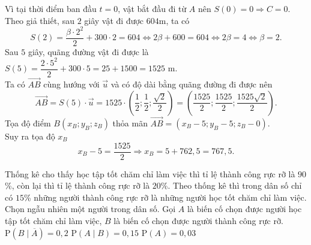 \begin{ex}
{\begin{itemchoice}
			Vì tại thời điểm ban đầu $t=0$, vật bắt đầu đi từ $A$ nên $S(0)=0 \Rightarrow C=0$.\\
			Theo giả thiết, sau $2$ giây vật đi được $604\mathrm{m}$, ta có
			\[S(2) = \dfrac{\beta \cdot 2^2}{2} + 300 \cdot 2 = 604 \Leftrightarrow 2\beta + 600 = 604 \Leftrightarrow 2\beta = 4 \Leftrightarrow \beta = 2.\]
			\itemch Sau $5$ giây, quãng đường vật đi được là
			$S(5) = \dfrac{2 \cdot 5^2}{2} + 300 \cdot 5 = 25 + 1500 = 1525$ m.\\
			Ta có $\overrightarrow{AB}$ cùng hướng với $\overrightarrow{u}$ và có độ dài bằng quãng đường đi được nên
			\[\overrightarrow{AB} = S(5) \cdot \overrightarrow{u} = 1525 \cdot \left(\dfrac{1}{2}; \dfrac{1}{2}; \dfrac{\sqrt{2}}{2}\right) = \left(\dfrac{1525}{2}; \dfrac{1525}{2}; \dfrac{1525\sqrt{2}}{2}\right).\]
			Tọa độ điểm $B(x_B; y_B; z_B)$ thỏa mãn $\overrightarrow{AB} = (x_B - 5; y_B - 5; z_B - 0)$.\\
			Suy ra tọa độ $x_B$
			\[x_B - 5 = \dfrac{1525}{2} \Rightarrow x_B = 5 + 762{,}5 = 767{,}5.\]
		\end{itemchoice}
	}
\end{ex}

\begin{ex}%
	Thống kê cho thấy học tập tốt chăm chỉ làm việc thì tỉ lệ thành công rực rỡ là $90$\%, còn lại thì tỉ lệ thành công rực rỡ là $20$\%. Theo thống kê thì trong dân số chỉ có $15$\% những người thành công rực rỡ là những người học tốt chăm chỉ làm việc. Chọn ngẫu nhiên một người trong dân số. Gọi $A$ là biến cố chọn được người học tập tốt chăm chỉ làm việc, $B$ là biến cố chọn được người thành công rực rỡ.
	{\True $\mathrm{P}\left(B\mid\overline{A}\right)=0{,}2$}
	{\True $\mathrm{P}(A\mid B)=0{,}15$}
	{$\mathrm{P}(A)=0{,}03$}
\end{ex}

